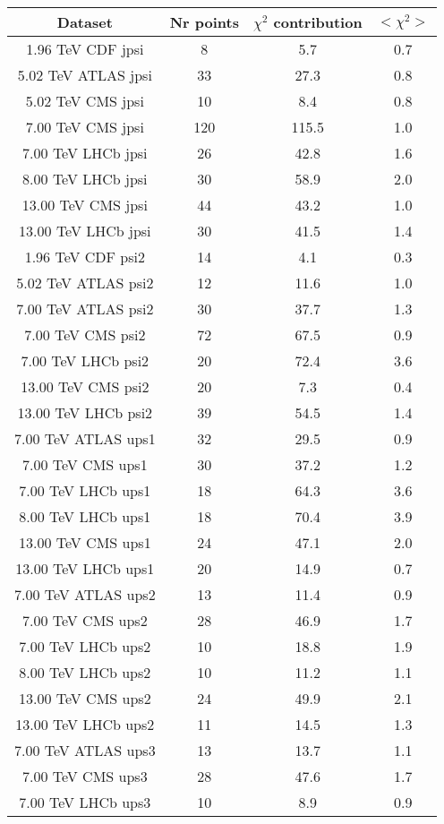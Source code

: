 \begin{table}[h!]
\centering
\begin{tabular}{c|c|c|c}
Dataset & Nr points & $\chi^2$ contribution & $<\chi^2>$ \\
\hline
1.96 TeV CDF jpsi & 8 & 5.7 & 0.7 \\
5.02 TeV ATLAS jpsi & 33 & 27.3 & 0.8 \\
5.02 TeV CMS jpsi & 10 & 8.4 & 0.8 \\
7.00 TeV CMS jpsi & 120 & 115.5 & 1.0 \\
7.00 TeV LHCb jpsi & 26 & 42.8 & 1.6 \\
8.00 TeV LHCb jpsi & 30 & 58.9 & 2.0 \\
13.00 TeV CMS jpsi & 44 & 43.2 & 1.0 \\
13.00 TeV LHCb jpsi & 30 & 41.5 & 1.4 \\
1.96 TeV CDF psi2 & 14 & 4.1 & 0.3 \\
5.02 TeV ATLAS psi2 & 12 & 11.6 & 1.0 \\
7.00 TeV ATLAS psi2 & 30 & 37.7 & 1.3 \\
7.00 TeV CMS psi2 & 72 & 67.5 & 0.9 \\
7.00 TeV LHCb psi2 & 20 & 72.4 & 3.6 \\
13.00 TeV CMS psi2 & 20 & 7.3 & 0.4 \\
13.00 TeV LHCb psi2 & 39 & 54.5 & 1.4 \\
7.00 TeV ATLAS ups1 & 32 & 29.5 & 0.9 \\
7.00 TeV CMS ups1 & 30 & 37.2 & 1.2 \\
7.00 TeV LHCb ups1 & 18 & 64.3 & 3.6 \\
8.00 TeV LHCb ups1 & 18 & 70.4 & 3.9 \\
13.00 TeV CMS ups1 & 24 & 47.1 & 2.0 \\
13.00 TeV LHCb ups1 & 20 & 14.9 & 0.7 \\
7.00 TeV ATLAS ups2 & 13 & 11.4 & 0.9 \\
7.00 TeV CMS ups2 & 28 & 46.9 & 1.7 \\
7.00 TeV LHCb ups2 & 10 & 18.8 & 1.9 \\
8.00 TeV LHCb ups2 & 10 & 11.2 & 1.1 \\
13.00 TeV CMS ups2 & 24 & 49.9 & 2.1 \\
13.00 TeV LHCb ups2 & 11 & 14.5 & 1.3 \\
7.00 TeV ATLAS ups3 & 13 & 13.7 & 1.1 \\
7.00 TeV CMS ups3 & 28 & 47.6 & 1.7 \\
7.00 TeV LHCb ups3 & 10 & 8.9 & 0.9 \\

\end{tabular}
\end{table}
